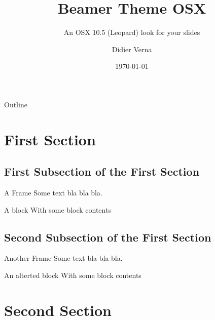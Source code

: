 \documentclass[aspectratio=1610]{beamer}
\title{Beamer Theme OSX}
\subtitle{An OSX 10.5 (Leopard) look for your slides}
\author{Didier Verna}
\institute{\em Resistance is futile.}
\date{\today}
\begin{document}
\frame{\titlepage}

\begin{frame}{Outline}
  \tableofcontents
\end{frame}

\section[First]{First Section}
\subsection[First First]{First Subsection of the First Section}
\begin{frame}{A Frame}
  Some text bla bla bla.
  \begin{block}{A block}
    With some block contents
  \end{block}
\end{frame}

\subsection[Second First]{Second Subsection of the First Section}
\begin{frame}{Another Frame}
  Some text bla bla bla.
  \begin{alertblock}{An alterted block}
    With some block contents
  \end{alertblock}
\end{frame}

\section[Second]{Second Section}
\end{document}
